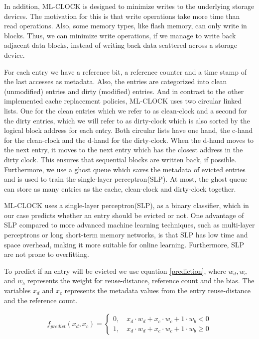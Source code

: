 \documentclass[
	12pt,
	a4paper,
	abstract,
	bibliography=totoc,
	chapterprefix,
	headings=openright,
	numbers=endperiod,
	parskip=half,
	twoside,
]{scrreprt}
\begin{document}
In addition, ML-CLOCK is designed to minimize writes to the underlying storage devices.
The motivation for this is that write operations take more time than read operations.
Also, some memory types, like flash memory, can only write in blocks.
Thus, we can minimize write operations, if we manage to write back adjacent data blocks, 
instead of writing back data scattered across a storage device.

For each entry we have a reference bit, a reference counter and a time stamp of the 
last accesses as metadata. 
Also, the entries are categorized into clean (unmodified) entries and dirty (modified) entries.
And in contrast to the other implemented cache replacement policies,
ML-CLOCK uses two circular linked lists.
One for the clean entries which we refer to as clean-clock 
and a second for the dirty entries, which we will refer to as dirty-clock
which is also sorted by the logical block address for each entry.
Both circular lists have one hand, the c-hand for the clean-clock and 
the d-hand for the dirty-clock.
When the d-hand moves to the next entry, it moves to the next entry 
which has the closest address in the dirty clock.
This ensures that sequential blocks are written back, if possible.
Furthermore, we use a ghost queue which saves the metadata of evicted entries and 
is used to train the single-layer perceptron(SLP).
At most, the ghost queue can store as many entries as the cache, clean-clock and dirty-clock together.

ML-CLOCK uses a single-layer perceptron(SLP), as a
binary classifier, which in our case predicts whether an entry should be evicted or not.
One advantage of SLP compared to more advanced machine learning techniques, such 
as multi-layer perceptrons or long short-term memory networks, is that
SLP has low time and space overhead,
making it more suitable for online learning.
Furthermore, SLP are not prone to overfitting.

To predict if an entry will be evicted we use equation \ref{prediction},
where $w_d, w_c$ and $w_b$ represents the weight for reuse-distance, reference count and the bias.
The variables $x_d$ and $x_c$ represents the metadata values from the entry reuse-distance and the reference count.

\begin{align}
	f_{predict} (x_d, x_c) =
	\begin{cases}
		0, \quad x_d \cdot w_d + x_c \cdot w_c + 1 \cdot w_b < 0 \\
		1, \quad x_d \cdot w_d + x_c \cdot w_c + 1 \cdot w_b \geq 0 \label{prediction}
	\end{cases}
\end{align}
\end{document}
